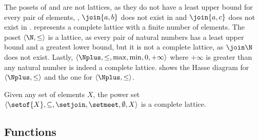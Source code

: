 \begin{example}
  The posets of  and  are not lattices, as they do not have a least upper bound for every pair of elements, \eg, $\join\{a, b\}$ does not exist in  and $\join\{a, c\}$ does not exist in .
%
   represents a complete lattice with a finite number of elements.
  The poset $\langle \N, \le \rangle$ is a lattice, as every pair of natural numbers has a least upper bound and a greatest lower bound, but it is not a complete lattice, as $\join \N$ does not exist.
  Lastly, $\langle \Nplus, \le, \max, \min, 0, +\infty \rangle$ where $+\infty$ is greater than any natural number is indeed a complete lattice.
   shows the Hasse diagram for $\langle \Nplus, \le \rangle$ and  the one for $\langle \Nplus, \le \rangle$.
\end{example}

\begin{remark}
  Given any set of elements $X$, the power set $\langle \setof{X}, \subseteq, \setjoin, \setmeet, \emptyset, X \rangle$ is a complete lattice.
\end{remark}


\subsection{Functions}


